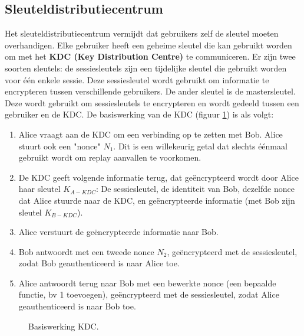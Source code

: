 \documentclass{report}
\begin{document}
	\subsection{Sleuteldistributiecentrum}
	Het sleuteldistributiecentrum vermijdt dat gebruikers zelf de sleutel moeten overhandigen. Elke gebruiker heeft een geheime sleutel die kan gebruikt worden om met het \textbf{KDC (Key Distribution Centre)} te communiceren. Er zijn twee soorten sleutels: de sessiesleutels zijn een tijdelijke sleutel die gebruikt worden voor één enkele sessie. Deze sessiesleutel wordt gebruikt om informatie te encrypteren tussen verschillende gebruikers. De ander sleutel is de mastersleutel. Deze wordt gebruikt om sessiesleutels te encrypteren en wordt gedeeld tussen een gebruiker en de KDC. De basiswerking van de KDC (figuur \ref{fig:basiswerkingKDC}) is als volgt:
	\begin{enumerate}
		\item Alice vraagt aan de KDC om een verbinding op te zetten met Bob. Alice stuurt ook een "nonce" $N_1$. Dit is een willekeurig getal dat slechts éénmaal gebruikt wordt om replay aanvallen te voorkomen.
		\item De KDC geeft volgende informatie terug, dat geëncrypteerd wordt door Alice haar sleutel $K_{A-KDC}$: De sessiesleutel, de identiteit van Bob, dezelfde nonce dat Alice stuurde naar de KDC, en geëncrypteerde informatie (met Bob zijn sleutel $K_{B-KDC}$).
		\item Alice verstuurt de geëncrypteerde informatie naar Bob.
		\item Bob antwoordt met een tweede nonce $N_2$, geëncrypteerd met de sessiesleutel, zodat Bob geauthenticeerd is naar Alice toe.
		\item Alice antwoordt terug naar Bob met een bewerkte nonce (een bepaalde functie, bv 1 toevoegen), geëncrypteerd met de sessiesleutel, zodat Alice geauthenticeerd is naar Bob toe.
	\end{enumerate}
	\begin{figure}
		\centering
		\caption{Basiswerking KDC.}
		\label{fig:basiswerkingKDC}
	\end{figure}
\end{document}
